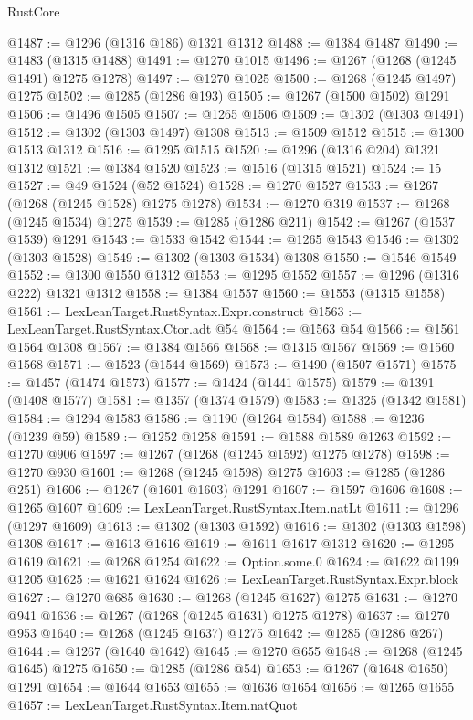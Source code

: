 \begin{lexlean}{RustCore}
\begin{coremodule}
@1487 := @1296 (@1316 @186) @1321 @1312
@1488 := @1384 @1487
@1490 := @1483 (@1315 @1488)
@1491 := @1270 @1015
@1496 := @1267 (@1268 (@1245 @1491) @1275 @1278)
@1497 := @1270 @1025
@1500 := @1268 (@1245 @1497) @1275
@1502 := @1285 (@1286 @193)
@1505 := @1267 (@1500 @1502) @1291
@1506 := @1496 @1505
@1507 := @1265 @1506
@1509 := @1302 (@1303 @1491)
@1512 := @1302 (@1303 @1497) @1308
@1513 := @1509 @1512
@1515 := @1300 @1513 @1312
@1516 := @1295 @1515
@1520 := @1296 (@1316 @204) @1321 @1312
@1521 := @1384 @1520
@1523 := @1516 (@1315 @1521)
@1524 := 15
@1527 := @49 @1524 (@52 @1524)
@1528 := @1270 @1527
@1533 := @1267 (@1268 (@1245 @1528) @1275 @1278)
@1534 := @1270 @319
@1537 := @1268 (@1245 @1534) @1275
@1539 := @1285 (@1286 @211)
@1542 := @1267 (@1537 @1539) @1291
@1543 := @1533 @1542
@1544 := @1265 @1543
@1546 := @1302 (@1303 @1528)
@1549 := @1302 (@1303 @1534) @1308
@1550 := @1546 @1549
@1552 := @1300 @1550 @1312
@1553 := @1295 @1552
@1557 := @1296 (@1316 @222) @1321 @1312
@1558 := @1384 @1557
@1560 := @1553 (@1315 @1558)
@1561 := LexLeanTarget.RustSyntax.Expr.construct
@1563 := LexLeanTarget.RustSyntax.Ctor.adt @54
@1564 := @1563 @54
@1566 := @1561 @1564 @1308
@1567 := @1384 @1566
@1568 := @1315 @1567
@1569 := @1560 @1568
@1571 := @1523 (@1544 @1569)
@1573 := @1490 (@1507 @1571)
@1575 := @1457 (@1474 @1573)
@1577 := @1424 (@1441 @1575)
@1579 := @1391 (@1408 @1577)
@1581 := @1357 (@1374 @1579)
@1583 := @1325 (@1342 @1581)
@1584 := @1294 @1583
@1586 := @1190 (@1264 @1584)
@1588 := @1236 (@1239 @59)
@1589 := @1252 @1258
@1591 := @1588 @1589 @1263
@1592 := @1270 @906
@1597 := @1267 (@1268 (@1245 @1592) @1275 @1278)
@1598 := @1270 @930
@1601 := @1268 (@1245 @1598) @1275
@1603 := @1285 (@1286 @251)
@1606 := @1267 (@1601 @1603) @1291
@1607 := @1597 @1606
@1608 := @1265 @1607
@1609 := LexLeanTarget.RustSyntax.Item.natLt
@1611 := @1296 (@1297 @1609)
@1613 := @1302 (@1303 @1592)
@1616 := @1302 (@1303 @1598) @1308
@1617 := @1613 @1616
@1619 := @1611 @1617 @1312
@1620 := @1295 @1619
@1621 := @1268 @1254
@1622 := Option.some.{0}
@1624 := @1622 @1199 @1205
@1625 := @1621 @1624
@1626 := LexLeanTarget.RustSyntax.Expr.block
@1627 := @1270 @685
@1630 := @1268 (@1245 @1627) @1275
@1631 := @1270 @941
@1636 := @1267 (@1268 (@1245 @1631) @1275 @1278)
@1637 := @1270 @953
@1640 := @1268 (@1245 @1637) @1275
@1642 := @1285 (@1286 @267)
@1644 := @1267 (@1640 @1642)
@1645 := @1270 @655
@1648 := @1268 (@1245 @1645) @1275
@1650 := @1285 (@1286 @54)
@1653 := @1267 (@1648 @1650) @1291
@1654 := @1644 @1653
@1655 := @1636 @1654
@1656 := @1265 @1655
@1657 := LexLeanTarget.RustSyntax.Item.natQuot

\end{coremodule}
\end{lexlean}
